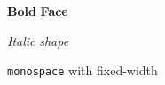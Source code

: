 \textbf{Bold}
{\bf Face}

\textit{Italic}
{\itshape shape}

\texttt{monospace}
{\ttfamily with fixed-width}
